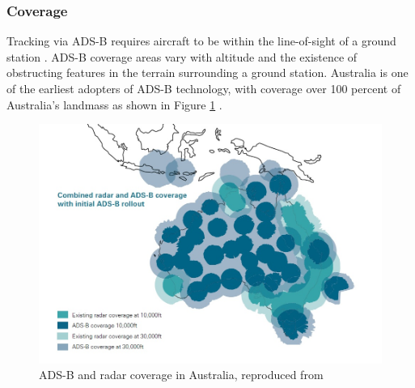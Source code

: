 \subsubsection{Coverage}
Tracking via ADS-B requires aircraft to be within the line-of-sight of a ground station \cite{ADSB_CASA_booklet}. ADS-B coverage areas vary with altitude and the existence of obstructing features in the terrain surrounding a ground station. Australia is one of the earliest adopters of ADS-B technology, with coverage over 100 percent of Australia's landmass as shown in Figure \ref{fig:adsb_aus_coverage} \cite{ADSB_CASA_booklet}.
\begin{figure}[H]
	\centering
	\includegraphics[scale = 0.5]{Pictures/adsb_coverage.jpg}
	
	\caption[ADS-B and radar coverage in Australia]{ADS-B and radar coverage in Australia, reproduced from \cite{ADSB_CASA_booklet}}
	\label{fig:adsb_aus_coverage}
\end{figure}

